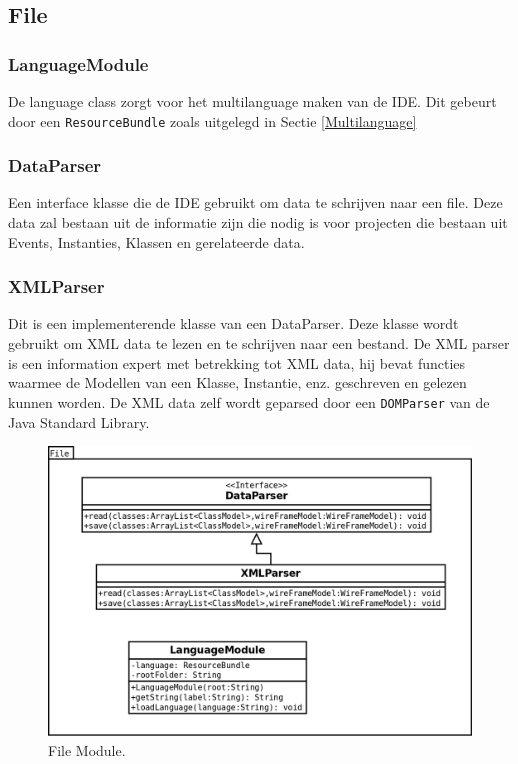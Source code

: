 \documentclass[]{article}
\begin{document}
\subsection{File}
\subsubsection{LanguageModule}
De language class zorgt voor het multilanguage maken van de IDE. Dit gebeurt door een \texttt{ResourceBundle} zoals uitgelegd in Sectie \ref{Multilanguage}

\subsubsection{DataParser}
Een interface klasse die de IDE gebruikt om data te schrijven naar een file. Deze data zal bestaan uit de informatie zijn die nodig is voor projecten die bestaan uit Events, Instanties, Klassen en gerelateerde data.

\subsubsection{XMLParser}
Dit is een implementerende klasse van een DataParser. Deze klasse wordt gebruikt om XML data  te lezen en te schrijven naar een bestand. De XML parser is een information expert met betrekking tot XML data, hij bevat functies waarmee de Modellen van een Klasse, Instantie, enz. geschreven en gelezen kunnen worden. De XML data zelf wordt geparsed door een \texttt{DOMParser} van de Java Standard Library.

\clearpage
 \begin{figure}
  \centering
   
\includegraphics[scale=0.8]{./AnalyseClassenDiagram/file.png}
  \caption{File Module.} \label{file}
\end{figure}
\clearpage
\end{document}
